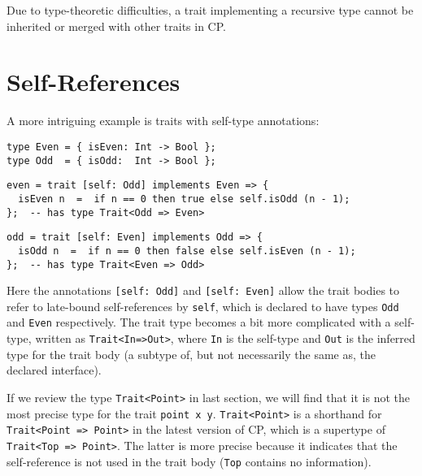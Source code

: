 \begin{tipblock}
Due to type-theoretic difficulties, a trait implementing a recursive type cannot
be inherited or merged with other traits in CP.
\end{tipblock}

\section{Self-References}

A more intriguing example is traits with self-type annotations:
\begin{lstlisting}
type Even = { isEven: Int -> Bool };
type Odd  = { isOdd:  Int -> Bool };
\end{lstlisting}
\vspace{-1ex}
\begin{lstlisting}
even = trait [self: Odd] implements Even => {
  isEven n  =  if n == 0 then true else self.isOdd (n - 1);
};  -- has type Trait<Odd => Even>
\end{lstlisting}
\vspace{-1ex}
\begin{lstlisting}
odd = trait [self: Even] implements Odd => {
  isOdd n  =  if n == 0 then false else self.isEven (n - 1);
};  -- has type Trait<Even => Odd>
\end{lstlisting}
Here the annotations \lstinline{[self: Odd]} and \lstinline{[self: Even]} allow
the trait bodies to refer to late-bound self-references by \lstinline{self},
which is declared to have types \lstinline{Odd} and \lstinline{Even}
respectively. The trait type becomes a bit more complicated with a self-type,
written as \lstinline{Trait<In=>Out>}, where \lstinline{In} is the self-type and
\lstinline{Out} is the inferred type for the trait body (a subtype of, but not
necessarily the same as, the declared interface).

\begin{tipblock}
If we review the type \lstinline{Trait<Point>} in last section, we will find
that it is not the most precise type for the trait \lstinline{point x y}.
\lstinline{Trait<Point>} is a shorthand for \lstinline{Trait<Point => Point>} in
the latest version of CP, which is a supertype of \lstinline{Trait<Top => Point>}.
The latter is more precise because it indicates that the self-reference is not
used in the trait body (\lstinline{Top} contains no information).
\end{tipblock}

